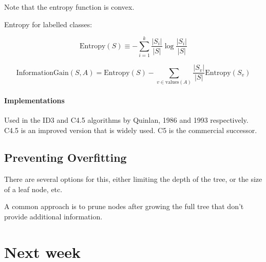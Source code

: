 \documentclass{idc_msc}
\begin{document}
Note that the entropy function is convex.

Entropy for labelled classes:

\[\text{Entropy}(S) \equiv - \sum_{i=1}^k \frac{|S_i|}{|S|} \log \frac{|S_i|}{|S|}\]

\[\text{InformationGain}(S,A) = \text{Entropy}(S) - \sum_{v \in \text{values}(A)} \frac{|S_v|}{|S|} \text{Entropy}(S_v)\]

\paragraph{Implementations}

Used in the ID3 and C4.5 algorithms by Quinlan, 1986 and 1993 respectively.
C4.5 is an improved version that is widely used.
C5 is the commercial successor.

\subsection{Preventing Overfitting}

There are several options for this, either limiting the depth of the tree, or the size of a leaf node, etc.

A common approach is to prune nodes after growing the full tree that don't provide additional information.

\section{Next week}
\end{document}
